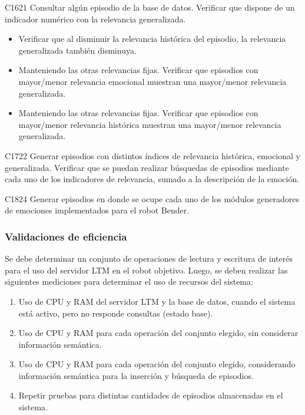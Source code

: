 \begin{def-validacion}{C}{16}{21}
Consultar algún episodio de la base de datos. Verificar que dispone de un indicador numérico con la relevancia generalizada.
\begin{itemize}
	\item Verificar que al disminuir la relevancia histórica del episodio, la relevancia generalizada también disminuya.
	\item Manteniendo las otras relevancias fijas. Verificar que episodios con mayor/menor relevancia emocional muestran una mayor/menor relevancia generalizada.
	\item Manteniendo las otras relevancias fijas. Verificar que episodios con mayor/menor relevancia histórica muestran una mayor/menor relevancia generalizada.
\end{itemize}	
\end{def-validacion}

\begin{def-validacion}{C}{17}{22}
Generar episodios con distintos índices de relevancia histórica, emocional y generalizada. Verificar que se puedan realizar búsquedas de episodios mediante cada uno de los indicadores de relevancia, sumado a la descripción de la emoción.	
\end{def-validacion}

\begin{def-validacion}{C}{18}{24}
	Generar episodios en donde se ocupe cada uno de los módulos generadores de emociones implementados para el robot Bender.
\end{def-validacion}


\subsubsection{Validaciones de eficiencia}

Se debe determinar un conjunto de operaciones de lectura y escritura de interés para el uso del servidor LTM en el robot objetivo. Luego, se deben realizar las siguientes mediciones para determinar el uso de recursos del sistema:
\begin{enumerate}
	\item Uso de CPU y RAM del servidor LTM y la base de datos, cuando el sistema está activo, pero no responde consultas (estado base).
	\item Uso de CPU y RAM para cada operación del conjunto elegido, sin considerar información semántica.
	\item Uso de CPU y RAM para cada operación del conjunto elegido, considerando información semántica para la inserción y búsqueda de episodios.
	\item Repetir pruebas para distintas cantidades de episodios almacenadas en el sistema.
\end{enumerate}

